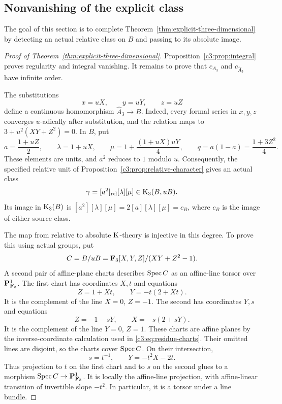 \subsection{Nonvanishing of the explicit class}\label{c3:sec:nonvanishing}

The goal of this section is to complete
Theorem~\ref{thm:explicit-three-dimensional} by detecting an actual
relative class on $B$ and passing to its absolute image.

\begin{proof}[Proof of Theorem~\ref{thm:explicit-three-dimensional}]
Proposition~\ref{c3:prop:integral} proves regularity and integral
vanishing.
It remains to prove that $c_{A_3}$ and $c_{\widehat A_3}$ have infinite
order.

The substitutions
\[
 x=uX,\qquad y=uY,\qquad z=uZ
\]
define a continuous homomorphism $\widehat A_3\to B$.
Indeed, every formal series in $x,y,z$ converges $u$-adically after
substitution, and the relation maps to
$3+u^2(XY+Z^2)=0$.
In $B$, put
\[
 a=\frac{1+uZ}{2},\qquad
 \lambda=1+uX,\qquad
 \mu=1+\frac{(1+uX)uY}{4},\qquad
 q=a(1-a)=\frac{1+3Z^2}{4}.
\]
These elements are units, and $a^2$ reduces to $1$ modulo $u$.
Consequently, the specified relative unit of
Proposition~\ref{c3:prop:relative-character} gives an actual class
\begin{equation}\label{c3:eq:relative-class}
 \gamma=[a^2]_{\mathrm{rel}}[\lambda][\mu]\in\operatorname{K}_3(B,uB).
\end{equation}
Its image in $\operatorname{K}_3(B)$ is
$[a^2][\lambda][\mu]=2[a][\lambda][\mu]=c_B$,
where $c_B$ is the image of either source class.

The map from relative to absolute $\operatorname{K}$-theory is injective in this
degree. To prove this using actual groups, put
\[
 C=B/uB=\mathbf{F}_3[X,Y,Z]/(XY+Z^2-1).
\]
A second pair of affine-plane charts describes $\operatorname{Spec} C$ as an
affine-line torsor over $\mathbf{P}^1_{\mathbf{F}_3}$.
The first chart has coordinates $X,t$ and equations
\[
 Z=1+Xt,\qquad Y=-t(2+Xt).
\]
It is the complement of the line $X=0$, $Z=-1$.
The second has coordinates $Y,s$ and equations
\[
 Z=-1-sY,\qquad X=-s(2+sY).
\]
It is the complement of the line $Y=0$, $Z=1$.
These charts are affine planes by the inverse-coordinate calculation
used in \eqref{c3:eq:residue-charts}.
Their omitted lines are disjoint, so the charts cover $\operatorname{Spec} C$.
On their intersection,
\begin{equation}\label{c3:eq:affine-line-transition}
 s=t^{-1},\qquad Y=-t^2X-2t.
\end{equation}
Thus projection to $t$ on the first chart and to $s$ on the second
glues to a morphism $\operatorname{Spec} C\to\mathbf{P}^1_{\mathbf{F}_3}$.
It is locally the affine-line projection, with affine-linear
transition of invertible slope $-t^2$.
In particular, it is a torsor under a line bundle.


\end{proof}
